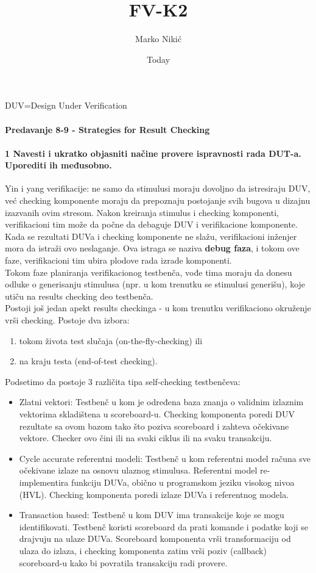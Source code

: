 \documentclass[a4paper, 12pt]{article}
\begin{document}
\title{FV-K2}
\date{Today}
\author{Marko Nikić}
\maketitle
DUV=Design Under Verification
\newpage
\paragraph{Predavanje 8-9 - Strategies for Result Checking}
\paragraph{1 Navesti i ukratko objasniti načine provere ispravnosti rada DUT-a. Uporediti ih međusobno.}
\hfill \break
\indent Yin i yang verifikacije: ne samo da stimulusi moraju dovoljno da istresiraju DUV, već checking komponente moraju da prepoznaju postojanje svih bugova u dizajnu izazvanih ovim stresom. Nakon kreiranja stimulus i checking komponenti, verifikacioni tim može da počne da debaguje DUV i verifikacione komponente. Kada se rezultati DUVa i checking komponente ne slažu, verifikacioni inženjer mora da istraži ovo neslaganje. Ova istraga se naziva \textbf{debug faza}, i tokom ove faze, verifikacioni tim ubira plodove rada izrade komponenti.\\
\indent Tokom faze planiranja verifikacionog testbenča, vođe tima moraju da donesu odluke o generisanju stimulusa (npr. u kom trenutku se stimulusi generišu), koje utiču na results checking deo testbenča.\\
\indent Postoji još jedan apekt results checkinga - u kom trenutku verifikaciono okruženje vrši checking. Postoje dva izbora:
\begin{enumerate}
\item tokom života test slučaja (on-the-fly-checking) ili 
\item na kraju testa (end-of-test checking).
\end{enumerate}
Podsetimo da postoje 3 različita tipa self-checking testbenčeva:
\begin{itemize}
\item Zlatni vektori: Testbenč u kom je određena baza znanja o validnim izlaznim vektorima skladištena u scoreboard-u. Checking komponenta poredi DUV rezultate sa ovom bazom tako što poziva scoreboard i zahteva očekivane vektore. Checker ovo čini ili na svaki ciklus ili na svaku transakciju.
\item Cycle accurate referentni modeli: Testbenč u kom referentni model računa sve očekivane izlaze na osnovu ulaznog stimulusa. Referentni model re-implementira funkciju DUVa, obično u programskom jeziku visokog nivoa (HVL). Checking komponenta poredi izlaze DUVa i referentnog modela.
\item Transaction based: Testbenč u kom DUV ima transakcije koje se mogu identifikovati. Testbenč koristi scoreboard da prati komande i podatke koji se drajvuju na ulaze DUVa. Scoreboard komponenta vrši transformaciju od ulaza do izlaza, i checking komponenta zatim vrši poziv (callback) scoreboard-u kako bi povratila transakciju radi provere.
\end{itemize}
\end{document}
